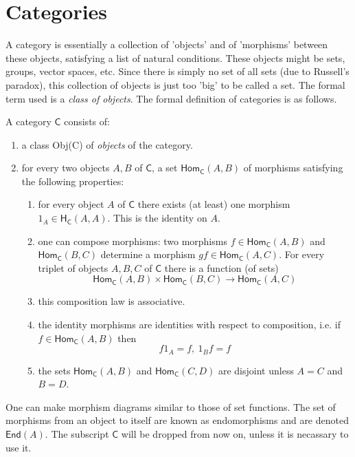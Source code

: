 \section{Categories}
A category is essentially a collection of 'objects' and of 'morphisms' between these objects, satisfying a list of natural conditions. These objects might be sets, groups, vector spaces, etc. Since there is simply no set of all sets (due to Russell's paradox), this collection of objects is just too 'big' to be called a set. The formal term used is a \textit{class of objects}. The formal definition of categories is as follows.
\begin{definition}
  A category $\mathsf{C}$ consists of:
  \begin{enumerate}
    \item a class Obj(C) of \textit{objects} of the category.
    \item for every two objects $A,B$ of $\mathsf{C}$, a set $\mathsf{Hom}_{\mathsf{C}}(A,B)$ of morphisms satisfying the following properties:
      \begin{enumerate}
        \item for every object $A$ of $\mathsf{C}$ there exists (at least) one morphism $1_A \in \mathsf{H}_{\mathsf{C}}(A,A)$. This is the identity on $A$.
        \item one can compose morphisms: two morphisms $f\in \mathsf{Hom}_{\mathsf{C}}(A,B)$ and $\mathsf{Hom}_{\mathsf{C}}(B,C)$ determine a morphism $gf\in\mathsf{Hom}_{\mathsf{C}}(A,C)$. For every triplet of objects $A,B,C$ of $\mathsf{C}$ there is a function (of sets)
          \[\mathsf{Hom}_{\mathsf{C}}(A,B) \times\mathsf{Hom}_{\mathsf{C}}(B,C)\to\mathsf{Hom}_{\mathsf{C}}(A,C) \]
        \item this composition law is associative.
        \item the identity morphisms are identities with respect to composition, i.e. if $f\in\mathsf{Hom}_{\mathsf{C}}(A,B)$ then
          \[f1_A = f,\ 1_Bf = f\]
        \item the sets $\mathsf{Hom}_{\mathsf{C}}(A,B)$ and $\mathsf{Hom}_{\mathsf{C}}(C,D)$ are disjoint unless $A=C$ and $B=D$.
      \end{enumerate}
  \end{enumerate}
\end{definition}
One can make morphism diagrams similar to those of set functions. The set of morphisms from an object to itself are known as endomorphisms and are denoted $\mathsf{End}(A)$. The subscript $\mathsf{C}$ will be dropped from now on, unless it is necassary to use it. 
